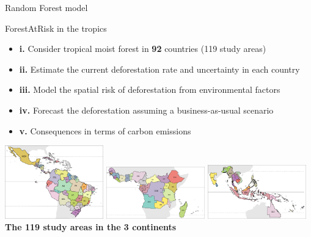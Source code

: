\documentclass[10pt,table,dvipsnames,compress]{beamer}
\begin{document}
\begin{frame}[label={sec:orgff7a149}]{Random Forest model}
\end{frame}

\begin{frame}[label={sec:org38f39a7}]{ForestAtRisk in the tropics}
\begin{itemize}
\item \textbf{i.} Consider tropical moist forest in \textbf{92} countries (119 study areas)
\item \textbf{ii.} Estimate the current deforestation rate and uncertainty in each country
\item \textbf{iii.} Model the spatial risk of deforestation from environmental factors
\item \textbf{iv.} Forecast the deforestation assuming a business-as-usual scenario
\item \textbf{v.} Consequences in terms of carbon emissions
\end{itemize}

\vspace{0.5cm}
\begin{center}
\includegraphics[width=0.32\textwidth]{figs/sm/study_areas_America}
\includegraphics[width=0.32\textwidth]{figs/sm/study_areas_Africa}
\includegraphics[width=0.32\textwidth]{figs/sm/study_areas_Asia}
\textbf{The 119 study areas in the 3 continents}
\end{center}
\end{frame}
\end{document}

